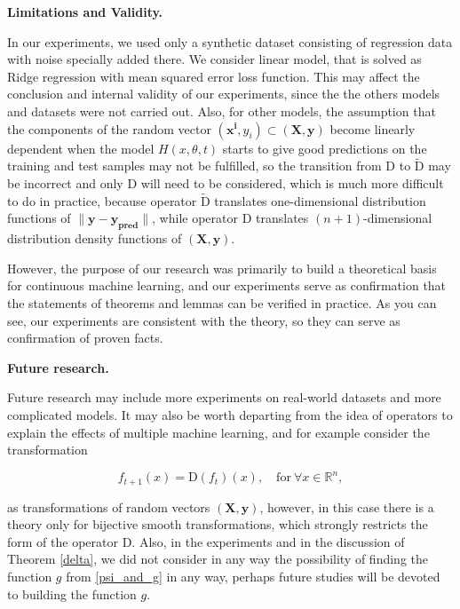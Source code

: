 \documentclass{article}
\begin{document}
        \textbf{Limitations and Validity.}
        
        In our experiments, we used only a synthetic dataset consisting of regression data with noise specially added there. We consider linear model, that is solved as Ridge regression with mean squared error loss function. This may affect the conclusion and internal validity of our experiments, since the the others models and datasets were not carried out. Also, for other models, the assumption that the components of the random vector $(\mathbf{x^i}, y_i) \subset (\mathbf{X}, \mathbf{y})$ become linearly dependent when the model $H(x, \theta, t)$ starts to give good predictions on the training and test samples may not be fulfilled, so the transition from $\text{D}$ to $\widetilde{\text{D}}$ may be incorrect and only $\text{D}$ will need to be considered, which is much more difficult to do in practice, because operator $\widetilde{\text{D}}$ translates one-dimensional distribution functions of $\|\mathbf{y} - \mathbf{y_{\text{pred}}}\|$, while operator $\text{D}$ translates $(n+1)$-dimensional distribution density functions of $(\mathbf{X}, \mathbf{y})$.
        
        However, the purpose of our research was primarily to build a theoretical basis for continuous machine learning, and our experiments serve as confirmation that the statements of theorems and lemmas can be verified in practice. As you can see, our experiments are consistent with the theory, so they can serve as confirmation of proven facts.

        \textbf{Future research.}

        Future research may include more experiments on real-world datasets and more complicated models. It may also be worth departing from the idea of operators to explain the effects of multiple machine learning, and for example consider the transformation
        
        \begin{equation*}
            f_{t+1}(x) = \text{D}(f_t)(x), \quad \text{for}~ \forall x \in \mathbb{R}^n,
        \end{equation*}
        
        as transformations of random vectors $(\mathbf{X}, \mathbf{y})$, however, in this case there is a theory only for bijective smooth transformations, which strongly restricts the form of the operator $\text{D}$. Also, in the experiments and in the discussion of Theorem \ref{delta}, we did not consider in any way the possibility of finding the function $g$ from \eqref{psi_and_g} in any way, perhaps future studies will be devoted to building the function $g$. 
\end{document}
